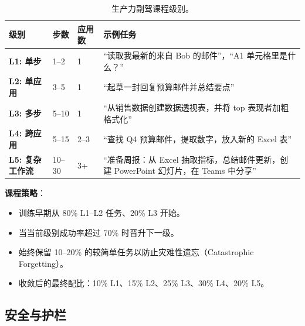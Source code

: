 \begin{table}[ht!]
\centering
\caption{生产力副驾课程级别。}
{\small
\noindent\begin{tabularx}{\linewidth}{@{}l l l Z{1}@{}}
\toprule
\textbf{级别} & \textbf{步数} & \textbf{应用数} & \textbf{示例任务} \\
\midrule
\textbf{L1: 单步} & 1--2 & 1 & ``读取我最新的来自 Bob 的邮件''，``A1 单元格里是什么？'' \\
\textbf{L2: 单应用} & 3--5 & 1 & ``起草一封回复预算邮件并总结要点'' \\
\textbf{L3: 多步} & 5--10 & 1 & ``从销售数据创建数据透视表，并将 top 表现者加粗格式化'' \\
\textbf{L4: 跨应用} & 5--15 & 2--3 & ``查找 Q4 预算邮件，提取数字，放入新的 Excel 表'' \\
\textbf{L5: 复杂工作流} & 10--30 & 3+ & ``准备周报：从 Excel 抽取指标，总结邮件更新，创建 PowerPoint 幻灯片，在 Teams 中分享'' \\
\bottomrule
\end{tabularx}
}
\end{table}

\textbf{课程策略}：

\begin{itemize}
  \item 训练早期从 80\% L1--L2 任务、20\% L3 开始。
  \item 当当前级别成功率超过 70\% 时晋升下一级。
  \item 始终保留 10--20\% 的较简单任务以防止灾难性遗忘（Catastrophic Forgetting）。
  \item 收敛后的最终配比：10\% L1、15\% L2、25\% L3、30\% L4、20\% L5。
\end{itemize}

\subsection{安全与护栏}
\label{safety-and-guardrails}

